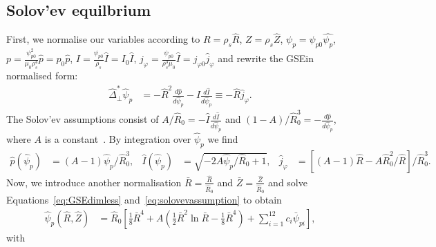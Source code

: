 \documentclass{hitec} %
\begin{document}
\subsection{Solov'ev equilbrium}\label{sec:solovev}
First, we normalise our variables according to \( R = \rho_s \hat{R} \), \( Z = \rho_s \hat{Z} \), \( \psi_p = \psi_{p0} \hat{\psi_p}\), \( p =  \frac{\psi_{p0}^2}{\mu_0 \rho_s^4}\hat{p}= p_0 \hat{p} \), \( I = \frac{\psi_{p0}}{\rho_s} \hat{I} = I_0 \hat{I} \), 
 \(j_\varphi = \frac{\psi_{p0}}{\rho_s^3 \mu_0} \hat{I} = j_{\varphi 0} \hat{j}_\varphi \) and rewrite the GSEin normalised form:
\begin{align}\label{eq:GSEdimless}
 \hat{\Delta}^*_\perp  \hat{\psi}_p &= -\hat{R}^2 \frac{d \hat{p}}{d  \hat{\psi}_p } - \hat{I} \frac{d \hat{I}}{d  \hat{\psi}_p }\equiv - \hat{R} \hat{j}_\varphi.
\end{align}
The Solov'ev assumptions consist of \(A/\hat{R}_0 = -\hat{I} \frac{d \hat{I}}{d  \hat{\psi}_p }\) and \((1-A)/\hat{R}_0^3 = -\frac{d \hat{p}}{d  \hat{\psi}_p }\), where \(A\) is a constant~\cite{solovev68,solovev76}.
By integration over \(\hat{\psi}_p\) we find
\begin{align}\label{eq:solovevassumption}
 \hat{p}(\hat{\psi}_p) &= (A-1)\hat{\psi}_p/\hat{R}_0^3,  &
 \hat{I}(\hat{\psi}_p) &= \sqrt{-2 A \hat{\psi}_p/\hat{R}_0 + 1}, &
 \hat{j}_\varphi &= \left[(A-1)\hat{R} - A \hat{R}_0^2 / \hat{R}\right]/\hat{R}_0^3.
\end{align}
Now, we introduce another normalisation  \(\bar{R} = \frac{\hat{R}}{\hat{R}_0}\) and \(\bar{Z} = \frac{\hat{Z}}{\hat{R}_0}\) 
and solve Equations~\eqref{eq:GSEdimless} and~\eqref{eq:solovevassumption} to obtain
\begin{align}
 \hat{\psi}_p (\hat{R},\hat{Z}) &= \hat{R}_0 \left[ \frac{1}{8}\bar{R}^4 + A\left( \frac{1}{2} \bar{R}^2 \ln{\bar{R}} 
   - \frac{1}{8}\bar{R}^4\right) + \sum_{i=1}^{12} c_{i}  \bar{\psi}_{pi}\right],
\end{align}
with
\end{document}
